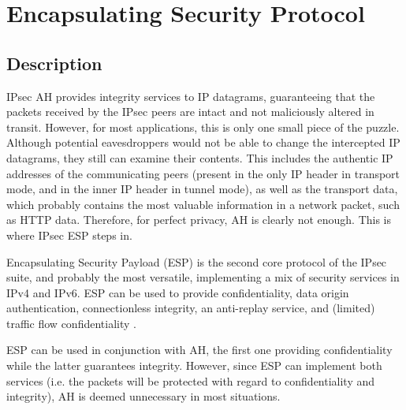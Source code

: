 \documentclass[a4paper,12pt]{report}
\begin{document}
		\section{Encapsulating Security Protocol}
		\subsection{Description}
		IPsec AH provides integrity services to IP datagrams, guaranteeing that the packets received by the IPsec peers are intact and not maliciously altered in transit. However, for most applications, this is only one small piece of the puzzle. Although potential eavesdroppers would not be able to change the intercepted IP datagrams, they still can examine their contents. This includes the authentic IP addresses of the communicating peers (present in the only IP header in transport mode, and in the inner IP header in tunnel mode), as well as the transport data, which probably contains the most valuable information in a network packet, such as HTTP data. Therefore, for perfect privacy, AH is clearly not enough. This is where IPsec ESP steps in.
		
		Encapsulating Security Payload (ESP) is the second core protocol of the IPsec suite, and probably the most versatile, implementing a mix of security services in IPv4 and IPv6. ESP can be used to provide confidentiality, data origin authentication, connectionless integrity, an anti-replay service, and (limited) traffic flow confidentiality \cite{rfc4303}.
		
		ESP can be used in conjunction with AH, the first one providing confidentiality while the latter guarantees integrity. However, since ESP can implement both services (i.e. the packets will be protected with regard to confidentiality and integrity), AH is deemed unnecessary in most situations.
		
\end{document}
